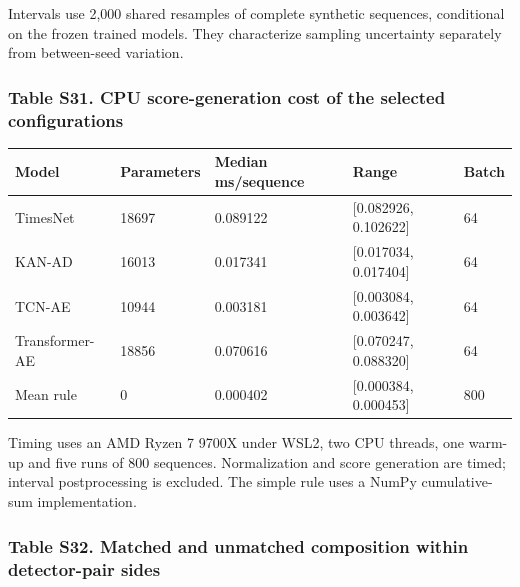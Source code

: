 \documentclass[a4paper,11pt]{article}
\newcounter{none}
\begin{document}
Intervals use 2,000 shared resamples of complete synthetic sequences, conditional on the frozen trained models. They characterize sampling uncertainty separately from between-seed variation.

\subsubsection{Table S31. CPU score-generation cost of the selected configurations}\label{table-s31.-cpu-score-generation-cost-of-the-selected-configurations}

{\def\LTcaptype{none} %
\begin{longtable}[]{@{}lllll@{}}
\toprule\noalign{}
Model & Parameters & Median ms/sequence & Range & Batch \\
\midrule\noalign{}
\endhead
\bottomrule\noalign{}
\endlastfoot
TimesNet & 18697 & 0.089122 & {[}0.082926, 0.102622{]} & 64 \\
KAN-AD & 16013 & 0.017341 & {[}0.017034, 0.017404{]} & 64 \\
TCN-AE & 10944 & 0.003181 & {[}0.003084, 0.003642{]} & 64 \\
Transformer-AE & 18856 & 0.070616 & {[}0.070247, 0.088320{]} & 64 \\
Mean rule & 0 & 0.000402 & {[}0.000384, 0.000453{]} & 800 \\
\end{longtable}
}

Timing uses an AMD Ryzen 7 9700X under WSL2, two CPU threads, one warm-up and five runs of 800 sequences. Normalization and score generation are timed; interval postprocessing is excluded. The simple rule uses a NumPy cumulative-sum implementation.

\subsubsection{Table S32. Matched and unmatched composition within detector-pair sides}\label{table-s32.-matched-and-unmatched-composition-within-detector-pair-sides}
\end{document}
